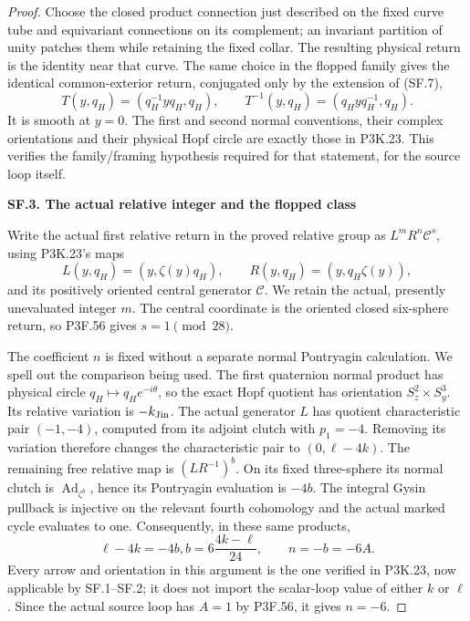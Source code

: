 \begin{proof}
Choose the closed product connection just described on the fixed
curve tube and equivariant connections on its complement; an
invariant partition of unity patches them while retaining the fixed
collar. The resulting physical return is the identity near that
curve. The same choice in the flopped family gives the identical
common-exterior return, conjugated only by the extension of (SF.7),
\[
 T(y,q_H)=(q_H^{-1}yq_H,q_H),\qquad
 T^{-1}(y,q_H)=(q_Hyq_H^{-1},q_H).                         \tag{SF.9}
\]
It is smooth at \(y=0\). The first and second normal conventions,
their complex orientations and their physical Hopf circle are exactly
those in P3K.23. This verifies the family/framing hypothesis required
for that statement, for the source loop itself.

\par

\medskip\noindent\textbf{SF.3. The actual relative integer and the flopped class}

\par\nobreak

Write the actual first relative return in the proved relative group
as \(L^mR^n\mathcal C^s\), using P3K.23's maps
\[
 L(y,q_H)=(y,\zeta(y)q_H),\qquad
 R(y,q_H)=(y,q_H\zeta(y)),
\]
and its positively oriented central generator \(\mathcal C\).
We retain the actual, presently unevaluated integer \(m\).
The central coordinate is the oriented closed six-sphere return,
so P3F.56 gives \(s=1\pmod {28}\).

The coefficient \(n\) is fixed without a separate normal
Pontryagin calculation. We spell out the comparison being used.
The first quaternion normal product has physical circle
\(q_H\mapsto q_He^{-i\theta}\), so the exact Hopf quotient has
orientation \(S^2_z\times S^3_y\). Its relative variation is
\(-k_{\rm Jin}\). The actual generator \(L\) has quotient
characteristic pair \((-1,-4)\), computed from its adjoint clutch
with \(p_1=-4\). Removing its variation therefore changes the
characteristic pair to \((0,\ell-4k)\). The remaining free relative
map is \((LR^{-1})^b\). On its fixed three-sphere its normal clutch
is \(\operatorname{Ad}_{\zeta^b}\), hence its Pontryagin evaluation
is \(-4b\). The integral Gysin pullback is injective on the relevant
fourth cohomology and the actual marked cycle evaluates to one.
Consequently, in these same products,
\[
           \ell-4k=-4b,
           b=6\frac{4k-\ell}{24},\qquad
           n=-b=-6A.                                    \tag{SF.10}
\]
Every arrow and orientation in this argument is the one verified in
P3K.23, now applicable by SF.1--SF.2; it does not import the scalar-loop
value of either \(k\) or \(\ell\). Since the actual source loop has
\(A=1\) by P3F.56, it gives \(n=-6\).


\end{proof}
